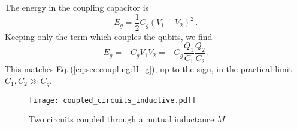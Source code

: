 
The energy in the coupling capacitor is
\begin{equation}
E_g = \frac{1}{2} C_g \left( V_1 - V_2 \right)^2 \, . \nonumber
\end{equation}
Keeping only the term which couples the qubits, we find \begin{equation}
E_g = -C_g V_1 V_2 = -C_g \frac{Q_1}{C_1} \frac{Q_2}{C_2} . \end{equation}
This matches Eq.\,(\ref{eq:sec:coupling:H_g}), up to the sign, in the practical limit $C_1,C_2 \gg C_g$.


\begin{figure}
\begin{centering}
\texttt{[image: coupled\_circuits\_inductive.pdf]}
\par\end{centering}
\caption{Two circuits coupled through a mutual inductance $M$.}
\label{Fig:coupledCircuits_inductive}
\end{figure}

